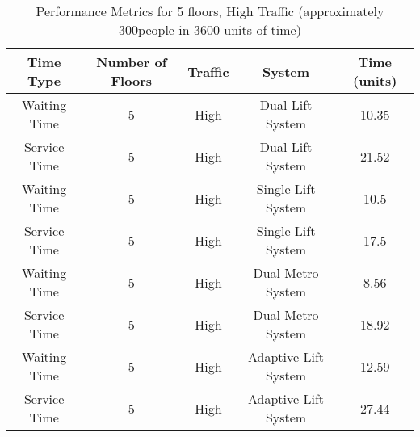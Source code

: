\documentclass[12pt,a4paper]{report}
\begin{document}
\begin{table}[H]
\centering
\begin{tabular}{|c|c|c|c|c|}
\hline
\textbf{Time Type}    & \textbf{Number of Floors} & \textbf{Traffic} & \textbf{System}     & \textbf{Time (units)} \\ \hline
Waiting Time         & 5                     & High             & Dual Lift System               & 10.35              \\ \hline
Service Time         & 5                     & High             & Dual Lift System               & 21.52              \\ \hline
Waiting Time         & 5                     & High             & Single Lift System            & 10.5               \\ \hline
Service Time         & 5                     & High             & Single Lift System         & 17.5               \\ \hline
Waiting Time         & 5                     & High             & Dual Metro System         & 8.56               \\ \hline
Service Time         & 5                     & High             & Dual Metro System         & 18.92              \\ \hline
Waiting Time         & 5                     & High             & Adaptive Lift System         & 12.59              \\ \hline
Service Time         & 5                     & High             & Adaptive Lift System         & 27.44              \\ \hline
\end{tabular}
\caption{Performance Metrics for 5 floors, High Traffic (approximately 300people in 3600 units of time)}
\end{table}
\end{document}
